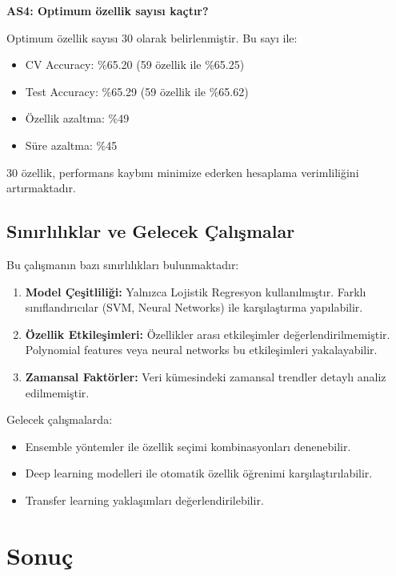 \documentclass[conference]{IEEEtran}
\begin{document}
\textbf{AS4: Optimum özellik sayısı kaçtır?}

Optimum özellik sayısı 30 olarak belirlenmiştir. Bu sayı ile:
\begin{itemize}
    \item CV Accuracy: \%65.20 (59 özellik ile \%65.25)
    \item Test Accuracy: \%65.29 (59 özellik ile \%65.62)
    \item Özellik azaltma: \%49
    \item Süre azaltma: \%45
\end{itemize}

30 özellik, performans kaybını minimize ederken hesaplama verimliliğini artırmaktadır.

\subsection{Sınırlılıklar ve Gelecek Çalışmalar}

Bu çalışmanın bazı sınırlılıkları bulunmaktadır:

\begin{enumerate}
    \item \textbf{Model Çeşitliliği:} Yalnızca Lojistik Regresyon kullanılmıştır. Farklı sınıflandırıcılar (SVM, Neural Networks) ile karşılaştırma yapılabilir.
    
    \item \textbf{Özellik Etkileşimleri:} Özellikler arası etkileşimler değerlendirilmemiştir. Polynomial features veya neural networks bu etkileşimleri yakalayabilir.
    
    \item \textbf{Zamansal Faktörler:} Veri kümesindeki zamansal trendler detaylı analiz edilmemiştir.
\end{enumerate}

Gelecek çalışmalarda:
\begin{itemize}
    \item Ensemble yöntemler ile özellik seçimi kombinasyonları denenebilir.
    \item Deep learning modelleri ile otomatik özellik öğrenimi karşılaştırılabilir.
    \item Transfer learning yaklaşımları değerlendirilebilir.
\end{itemize}

\section{Sonuç}
\end{document}

